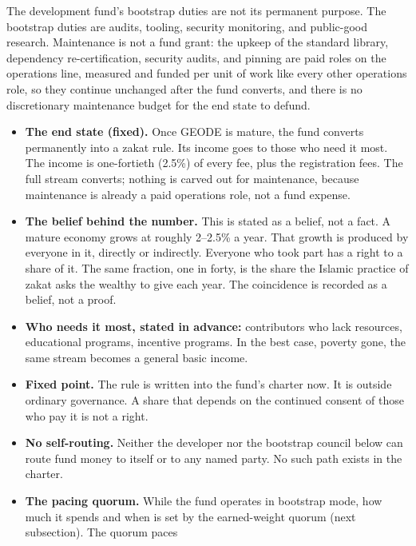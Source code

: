 \documentclass[11pt]{article}
\begin{document}
The development fund's bootstrap duties are not its permanent
purpose. The bootstrap duties are audits, tooling, security
monitoring, and public-good research. Maintenance is not a fund
grant: the upkeep of the standard library, dependency
re-certification, security audits, and pinning are paid roles on
the operations line, measured and funded per unit of work like
every other operations role, so they continue unchanged after
the fund converts, and there is no discretionary maintenance
budget for the end state to defund.
\begin{itemize}
    \item \textbf{The end state (fixed).} Once GEODE is mature, the
          fund converts permanently into a zakat rule. Its income goes to
          those who need it most. The income is one-fortieth (2.5\%) of
          every fee, plus the registration fees. The full stream converts;
          nothing is carved out for maintenance, because maintenance is
          already a paid operations role, not a fund expense.
    \item \textbf{The belief behind the number.} This is stated as a
          belief, not a fact. A mature economy grows at roughly 2--2.5\% a
          year. That growth is produced by everyone in it, directly or
          indirectly. Everyone who took part has a right to a share of it.
          The same fraction, one in forty, is the share the Islamic
          practice of zakat asks the wealthy to give each year. The
          coincidence is recorded as a belief, not a proof.
    \item \textbf{Who needs it most, stated in advance:}
          contributors who lack resources, educational programs, incentive
          programs. In the best case, poverty gone, the same stream becomes
          a general basic income.
    \item \textbf{Fixed point.} The rule is written into the fund's
          charter now. It is outside ordinary governance. A share that
          depends on the continued consent of those who pay it is not a
          right.
    \item \textbf{No self-routing.} Neither the developer nor the
          bootstrap council below can route fund money to itself or to
          any named party. No such path exists in the charter.
    \item \textbf{The pacing quorum.} While the fund operates in
          bootstrap mode, how much it spends and when is set by the
          earned-weight quorum (next subsection). The quorum paces

\end{itemize}
\end{document}
